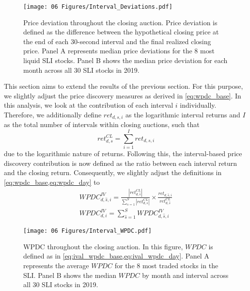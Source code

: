 \documentclass[11pt,a4paper, notitlepage]{article}
\begin{document}
	\begin{figure}[!t]
		\centering
		\texttt{[image: 06 Figures/Interval\_Deviations.pdf]}
		\caption{Price deviation throughout the closing auction. Price deviation is defined as the difference between the hypothetical closing price at the end of each 30-second interval and the final realized closing price. Panel A represents median price deviations for the 8 most liquid SLI stocks. Panel B shows the median price deviation for each month across all 30 SLI stocks in 2019.}
		\label{fig:InterDevs}
	\end{figure}
	
	This section aims to extend the results of the previous section. For this purpose, we slightly adjust the price discovery measures as derived in \cref{eq:wpdc_base}. In this analysis, we look at the contribution of each interval $i$ individually. Therefore, we additionally define $ret_{d,s,i}$ as the logarithmic interval returns and $I$ as the total number of intervals within closing auctions, such that
	\begin{equation*}
		ret^{CL}_{d,s} = \sum_{i=1}^{I} ret_{d,s,i}
	\end{equation*}
	due to the logarithmic nature of returns. Following this, the interval-based price discovery contribution is now defined as the ratio between each interval return and the closing return. Consequently, we slightly adjust the definitions in \cref{eq:wpdc_base,eq:wpdc_day} to
	\begin{gather}
		\label{eq:ival_wpdc_base}
		WPDC^{IV}_{d,\hat{s},i} = \frac{|ret^{CL}_{d,\hat{s}}|}{\sum_{s=1}^{S} |ret^{CL}_{d,s}|}  \times \frac{ret_{d,\hat{s},i}}{ret^{CL}_{d,\hat{s}}} \\[5mm] \label{eq:ival_wpdc_day}
		WPDC^{IV}_{d,i} = \sum_{\hat{s}=1}^{S} WPDC^{IV}_{d,\hat{s},i}
	\end{gather}
	
	
	\begin{figure}[h!t]
		\centering
		\texttt{[image: 06 Figures/Interval\_WPDC.pdf]}
		\caption{\ac{WPDC} throughout the closing auction. In this figure, $WPDC$ is defined as in \cref{eq:ival_wpdc_base,eq:ival_wpdc_day}. Panel A represents the average $WPDC$ for the 8 most traded stocks in the SLI. Panel B shows the median $WPDC$ by month and interval across all 30 SLI stocks in 2019.}
		\label{fig:InterWPDC}
	\end{figure}
	
\end{document}
